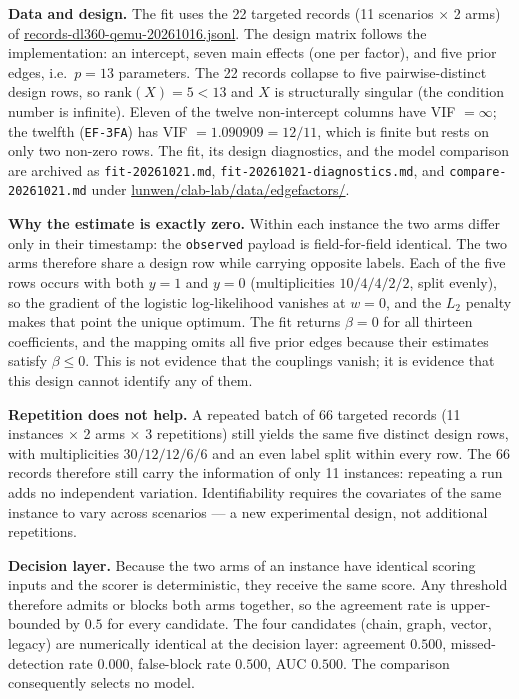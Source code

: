 \documentclass[preprints,article,accept,oneauthor]{Definitions/mdpi}
\begin{document}
\textbf{Data and design.} The fit uses the 22 targeted records (11 scenarios
$\times$ 2 arms) of
\url{records-dl360-qemu-20261016.jsonl}. The design matrix follows the
implementation: an intercept, seven main effects (one per factor), and five
prior edges, i.e.\ $p=13$ parameters. The 22 records collapse to five
pairwise-distinct design rows, so $\mathrm{rank}(X)=5<13$ and $X$ is
structurally singular (the condition number is infinite). Eleven of the
twelve non-intercept columns have VIF $=\infty$; the twelfth
(\texttt{EF-3FA}) has VIF $=1.090909=12/11$, which is finite but rests on
only two non-zero rows. The fit, its design diagnostics, and the model
comparison are archived as \texttt{fit-20261021.md},
\texttt{fit-20261021-diagnostics.md}, and \texttt{compare-20261021.md} under
\url{lunwen/clab-lab/data/edgefactors/}.

\textbf{Why the estimate is exactly zero.} Within each instance the two arms
differ only in their timestamp: the \texttt{observed} payload is
field-for-field identical. The two arms therefore share a design row while
carrying opposite labels. Each of the five rows occurs with both $y=1$ and
$y=0$ (multiplicities $10/4/4/2/2$, split evenly), so the gradient of the
logistic log-likelihood vanishes at $w=0$, and the $L_2$ penalty makes that
point the unique optimum. The fit returns $\beta=0$ for all thirteen
coefficients, and the mapping omits all five prior edges because their
estimates satisfy $\beta\le0$. This is not evidence that the couplings
vanish; it is evidence that this design cannot identify any of them.

\textbf{Repetition does not help.} A repeated batch of 66 targeted records
(11 instances $\times$ 2 arms $\times$ 3 repetitions) still yields the same
five distinct design rows, with multiplicities $30/12/12/6/6$ and an even
label split within every row. The 66 records therefore still carry the
information of only 11 instances: repeating a run adds no independent
variation. Identifiability requires the covariates of the same instance to
vary across scenarios --- a new experimental design, not additional
repetitions.

\textbf{Decision layer.} Because the two arms of an instance have identical
scoring inputs and the scorer is deterministic, they receive the same score.
Any threshold therefore admits or blocks both arms together, so the
agreement rate is upper-bounded by $0.5$ for every candidate. The four
candidates (chain, graph, vector, legacy) are numerically identical at the
decision layer: agreement $0.500$, missed-detection rate $0.000$,
false-block rate $0.500$, AUC $0.500$. The comparison consequently selects
no model.
\end{document}
